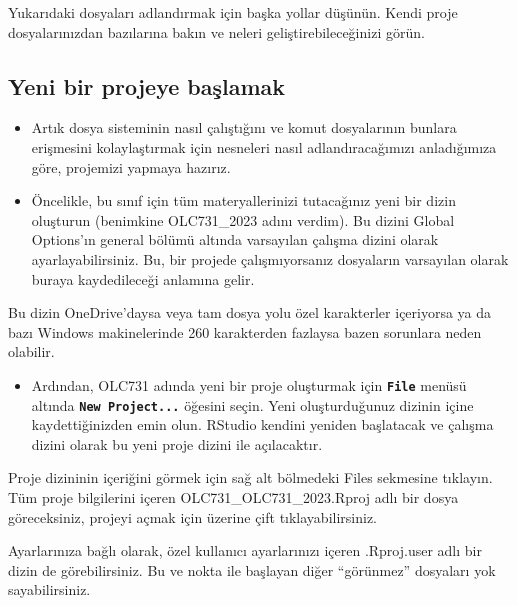 \documentclass[
  oneside]{book}
\providecommand{\tightlist}{%
  \setlength{\itemsep}{0pt}\setlength{\parskip}{0pt}}
\begin{document}
\begin{try}
Yukarıdaki dosyaları adlandırmak için başka yollar düşünün. Kendi proje dosyalarınızdan bazılarına bakın ve neleri geliştirebileceğinizi görün.

\end{try}

\hypertarget{yeni-bir-projeye-baux15flamak}{%
\subsection{Yeni bir projeye başlamak}\label{yeni-bir-projeye-baux15flamak}}

\begin{itemize}
\item
  Artık dosya sisteminin nasıl çalıştığını ve komut dosyalarının bunlara erişmesini kolaylaştırmak için nesneleri nasıl adlandıracağımızı anladığımıza göre, projemizi yapmaya hazırız.
\item
  Öncelikle, bu sınıf için tüm materyallerinizi tutacağınız yeni bir dizin oluşturun (benimkine OLC731\_2023 adını verdim). Bu dizini Global Options'ın general bölümü altında varsayılan çalışma dizini olarak ayarlayabilirsiniz. Bu, bir projede çalışmıyorsanız dosyaların varsayılan olarak buraya kaydedileceği anlamına gelir.
\end{itemize}

\begin{warning}
Bu dizin OneDrive'daysa veya tam dosya yolu özel karakterler içeriyorsa ya da bazı Windows makinelerinde 260 karakterden fazlaysa bazen sorunlara neden olabilir.

\end{warning}

\begin{itemize}
\tightlist
\item
  Ardından, OLC731 adında yeni bir proje oluşturmak için \textbf{\texttt{File}} menüsü altında \textbf{\texttt{New\ Project...}} öğesini seçin. Yeni oluşturduğunuz dizinin içine kaydettiğinizden emin olun. RStudio kendini yeniden başlatacak ve çalışma dizini olarak bu yeni proje dizini ile açılacaktır.
\end{itemize}

Proje dizininin içeriğini görmek için sağ alt bölmedeki Files sekmesine tıklayın. Tüm proje bilgilerini içeren OLC731\_OLC731\_2023.Rproj adlı bir dosya göreceksiniz, projeyi açmak için üzerine çift tıklayabilirsiniz.

\begin{info}
Ayarlarınıza bağlı olarak, özel kullanıcı ayarlarınızı içeren .Rproj.user adlı bir dizin de görebilirsiniz. Bu ve nokta ile başlayan diğer ``görünmez'' dosyaları yok sayabilirsiniz.

\end{info}
\end{document}
